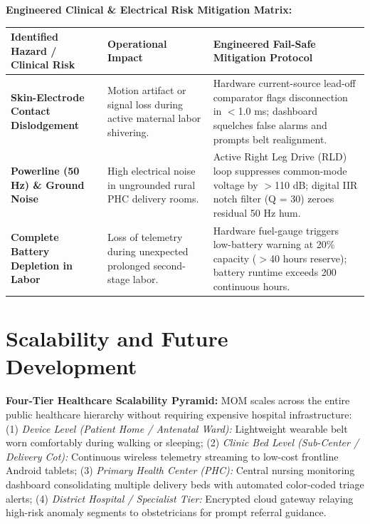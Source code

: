 \documentclass[10pt,a4paper]{article}
\begin{document}
\noindent
\textbf{Engineered Clinical \& Electrical Risk Mitigation Matrix:}
\vspace{0.2em}

\noindent
\begin{tabularx}{\textwidth}{p{3.5cm}p{4.2cm}X}
\toprule
\textbf{Identified Hazard / Clinical Risk} & \textbf{Operational Impact} & \textbf{Engineered Fail-Safe Mitigation Protocol} \\
\midrule
\textbf{Skin-Electrode Contact Dislodgement} & Motion artifact or signal loss during active maternal labor shivering. & Hardware current-source lead-off comparator flags disconnection in $<$1.0 ms; dashboard squelches false alarms and prompts belt realignment. \\
\addlinespace
\textbf{Powerline (50 Hz) \& Ground Noise} & High electrical noise in ungrounded rural PHC delivery rooms. & Active Right Leg Drive (RLD) loop suppresses common-mode voltage by $>$110 dB; digital IIR notch filter (Q = 30) zeroes residual 50 Hz hum. \\
\addlinespace
\textbf{Complete Battery Depletion in Labor} & Loss of telemetry during unexpected prolonged second-stage labor. & Hardware fuel-gauge triggers low-battery warning at 20\% capacity ($>$40 hours reserve); battery runtime exceeds 200 continuous hours. \\
\bottomrule
\end{tabularx}

\clearpage

\section{Scalability and Future Development}

\noindent
\textbf{Four-Tier Healthcare Scalability Pyramid:} MOM scales across the entire public healthcare hierarchy without requiring expensive hospital infrastructure:
(1) \textit{Device Level (Patient Home / Antenatal Ward):} Lightweight wearable belt worn comfortably during walking or sleeping;
(2) \textit{Clinic Bed Level (Sub-Center / Delivery Cot):} Continuous wireless telemetry streaming to low-cost frontline Android tablets;
(3) \textit{Primary Health Center (PHC):} Central nursing monitoring dashboard consolidating multiple delivery beds with automated color-coded triage alerts;
(4) \textit{District Hospital / Specialist Tier:} Encrypted cloud gateway relaying high-risk anomaly segments to obstetricians for prompt referral guidance.
\end{document}
